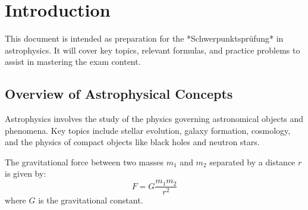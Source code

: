 \chapter{Introduction}
\label{ch:introduction}

This document is intended as preparation for the *Schwerpunktsprüfung* in astrophysics. It will cover key topics, relevant formulas, and practice problems to assist in mastering the exam content.

\section{Overview of Astrophysical Concepts}
Astrophysics involves the study of the physics governing astronomical objects and phenomena. Key topics include stellar evolution, galaxy formation, cosmology, and the physics of compact objects like black holes and neutron stars.

The gravitational force between two masses \( m_1 \) and \( m_2 \) separated by a distance \( r \) is given by:
\[
F = G \frac{m_1 m_2}{r^2}
\]
where \( G \) is the gravitational constant.
